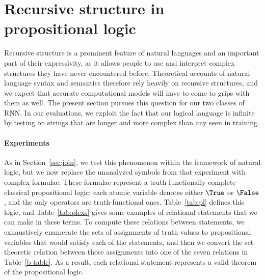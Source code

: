 \section{Recursive structure in propositional logic}\label{sec:recursion}

Recursive structure is a prominent feature of natural languages and an
important part of their expressivity, as it allows people to use and
interpret complex structures they have never encountered before.
Theoretical accounts of natural language syntax and semantics
therefore rely heavily on recursive structures, and we expect that
accurate computational models will have to come to grips with them as
well. The present section pursues this question for our two classes of
RNN. In our evaluations, we exploit the fact that our logical language
is infinite by testing on strings that are longer and more complex
than any seen in training.


\paragraph{Experiments}
As in Section~\ref{sec:join}, we test this phenomenon within the
framework of natural logic, but we now replace the unanalyzed symbols
from that experiment with complex formulae. These formulae
represent a truth-functionally complete classical propositional logic:
each atomic variable denotes either $\True$ or $\False$, and the only
operators are truth-functional ones.  Table~\ref{tab:pl} defines this
logic, and Table~\ref{tab:plexs} gives some examples of relational
statements that we can make in these terms. To compute these relations
between statements, we exhaustively enumerate the sets of assignments
of truth values to propositional variables that would satisfy each of
the statements, and then we convert the set-theoretic relation between
those assignments into one of the seven relations in
Table~\ref{b-table}. As a result, each relational statement represents
a valid theorem of the propositional logic.

